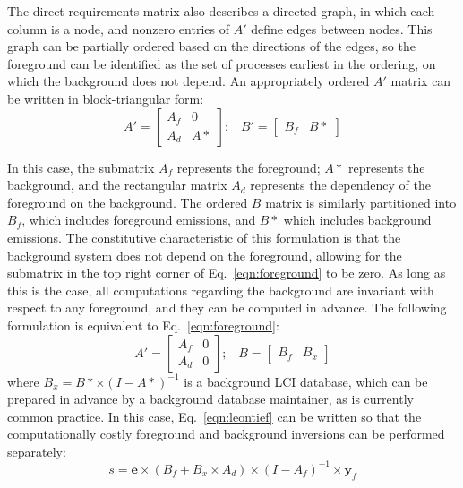 The direct requirements matrix also describes a directed graph, in which each column is a node, and nonzero entries of $A'$ define edges between nodes.  This graph can be partially ordered based on the directions of the edges, so the foreground can be identified as the set of processes earliest in the ordering, on which the background does not depend.  An appropriately ordered $A'$ matrix can be written in block-triangular form:
\begin{equation}
A' = \left[\begin{array}{cc}
A_f & 0 \\
A_d &  A*
  \end{array}
\right];\;\;\;  B' = \left[\begin{array}{cc} B_f & B*   \end{array}\right]
\label{eqn:foreground}
\end{equation}


In this case, the submatrix $A_f$ represents the foreground; $A*$ represents the background, and the rectangular matrix $A_d$ represents the dependency of the foreground on the background.  The ordered $B$ matrix is similarly partitioned into $B_f$, which includes foreground emissions, and $B*$ which includes background emissions. The constitutive characteristic of this formulation is that the background system does not depend on the foreground, allowing for the submatrix in the top right corner of Eq.~\ref{eqn:foreground} to be zero.  As long as this is the case, all computations regarding the background are invariant with respect to any foreground, and they can be computed in advance.  The following formulation is equivalent to Eq.~\ref{eqn:foreground}:
\begin{equation}
 A' = \left[\begin{array}{cc} 
A_f &  0 \\
A_d & 0 
   \end{array}\right];\;\;\;  B = \left[\begin{array}{cc} B_f & B_x \end{array}\right ]
\end{equation}
where $B_x = B* \times (I - A*)^{-1}$ is a background LCI database, which can be prepared in advance by a background database maintainer, as is currently common practice.  In this case, Eq.~\ref{eqn:leontief} can be written so that the computationally costly foreground and background inversions can be performed separately:
\begin{equation}
s = \mathbf{e} \times (B_f + B_x\times A_d) \times (I - A_f)^{-1} \times \mathbf{y}_f
\label{eqn:study}
\end{equation}

